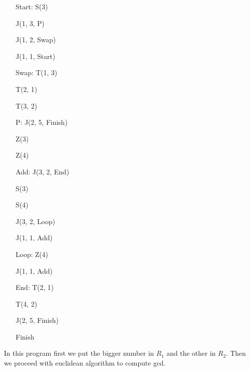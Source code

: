 \begin{itemize}
    \item[Start:] S(3)
    \item[] J(1, 3, P)
    \item[] J(1, 2, Swap)
    \item[] J(1, 1, Start)
    \item[Swap:] T(1, 3)
    \item[] T(2, 1)
    \item[] T(3, 2)
    \item[P:] J(2, 5, Finish)
    \item[] Z(3)
    \item[] Z(4)
    \item[Add:] J(3, 2, End)
    \item[] S(3)
    \item[] S(4)
    \item[] J(3, 2, Loop)
    \item[] J(1, 1, Add) 
    \item[Loop:] Z(4)
    \item[] J(1, 1, Add)
    \item[End:] T(2, 1)
    \item[] T(4, 2)
    \item[] J(2, 5, Finish)
    \item[Finish]
\end{itemize}
In this program first we put the bigger number in $R_1$ and the other in $R_2$. Then we proceed with euclidean algorithm to compute gcd.